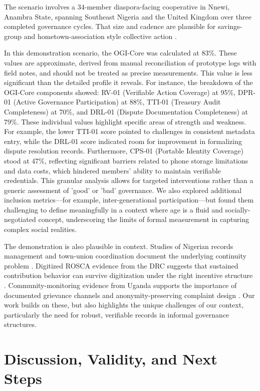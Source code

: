 \documentclass[sigconf,anonymous]{acmart}
\begin{document}
The scenario involves a 34-member diaspora-facing cooperative in Nnewi, Anambra State, spanning Southeast Nigeria and the United Kingdom over three completed governance cycles. That size and cadence are plausible for savings-group and hometown-association style collective action \cite{besley1993}.

In this demonstration scenario, the OGI-Core was calculated at 83\%. These values are approximate, derived from manual reconciliation of prototype logs with field notes, and should not be treated as precise measurements. This value is less significant than the detailed profile it reveals. For instance, the breakdown of the OGI-Core components showed: RV-01 (Verifiable Action Coverage) at 95\%, DPR-01 (Active Governance Participation) at 88\%, TTI-01 (Treasury Audit Completeness) at 70\%, and DRL-01 (Dispute Documentation Completeness) at 79\%. These individual values highlight specific areas of strength and weakness. For example, the lower TTI-01 score pointed to challenges in consistent metadata entry, while the DRL-01 score indicated room for improvement in formalizing dispute resolution records. Furthermore, CPS-01 (Portable Identity Coverage) stood at 47\%, reflecting significant barriers related to phone storage limitations and data costs, which hindered members’ ability to maintain verifiable credentials. This granular analysis allows for targeted interventions rather than a generic assessment of 'good' or 'bad' governance. We also explored additional inclusion metrics---for example, inter-generational participation---but found them challenging to define meaningfully in a context where age is a fluid and socially-negotiated concept, underscoring the limits of formal measurement in capturing complex social realities.

The demonstration is also plausible in context. Studies of Nigerian records management and town-union coordination document the underlying continuity problem \cite{abioye2007, honey1998}. Digitized ROSCA evidence from the DRC suggests that sustained contribution behavior can survive digitization under the right incentive structure \cite{chioda2021}. Community-monitoring evidence from Uganda supports the importance of documented grievance channels and anonymity-preserving complaint design \cite{bjorkman2009}. Our work builds on these, but also highlights the unique challenges of our context, particularly the need for robust, verifiable records in informal governance structures.

\section{Discussion, Validity, and Next Steps}
\end{document}
